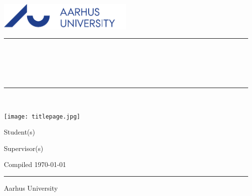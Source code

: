 \begin{titlepage}
\setcounter{page}{0}
	\begin{center}
		\includegraphics[width=0.5\textwidth]{../template/au-logo-blue.pdf}
		\noindent \textcolor{au-blue}{\rule{16cm}{0.5mm}} \\
        \begin{minipage}[t]{16 cm}
            \vspace{1mm}
            \begin{center}
        		\Huge
        		\textbf{\aucoursename} \\
        		\LARGE \aureporttitle \\
            \end{center}
            \vspace{1mm}
        \end{minipage}
		\noindent \textcolor{au-blue}{\rule{16cm}{0.5mm}} \\

        \vspace{1cm}


        \texttt{[image: titlepage.jpg]}

        \vspace{1cm}


		\begin{minipage}[t]{8cm} \flushleft
			\Large Student(s) \\
			\large \textsc{\austudentslist}
		\end{minipage}%
		\begin{minipage}[t]{8cm} \flushright
			\Large Supervisor(s) \\
			\large \textsc{\ausupervisorslist}
		\end{minipage}%

		\vfill

		\begin{minipage}[t]{16cm} \flushleft
			\large Compiled \Large \textsc{\today} \\
		\end{minipage}
		\begin{minipage}[t]{16cm} \flushright
			\noindent
            \textcolor{au-blue}{\rule{16cm}{0.5mm}}
			\large Aarhus University \\
			\aufacultyname \\
			\audepartmentname
		\end{minipage}%
	\end{center}
\end{titlepage}